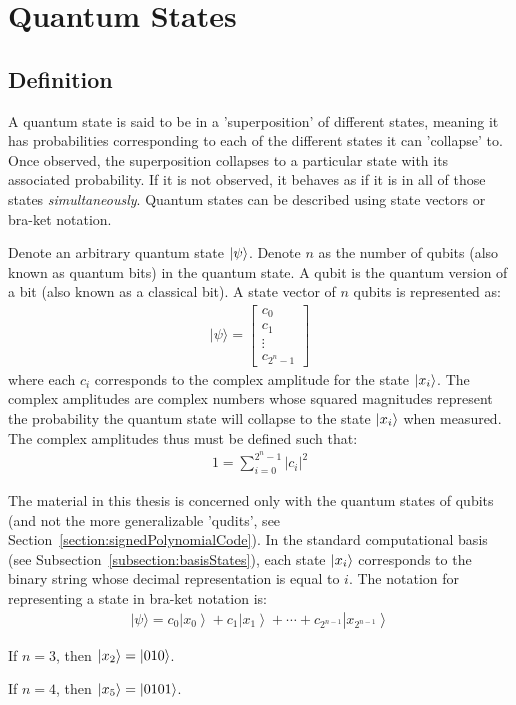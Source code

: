 \section{Quantum States}
\subsection{Definition}
A quantum state is said to be in a 'superposition' of different states, meaning it has probabilities corresponding to each of the different states it can 'collapse' to. Once observed, the superposition collapses to a particular state with its associated probability. If it is not observed, it behaves as if it is in all of those states \emph{simultaneously}. Quantum states can be described using state vectors or bra-ket notation.

Denote an arbitrary quantum state $\ket{\psi}$. Denote $n$ as the number of qubits (also known as quantum bits) in the quantum state. A qubit is the quantum version of a bit (also known as a classical bit). A state vector of $n$ qubits is represented as:
\begin{align}
|\psi\rangle=\left[\begin{array}{c}
c_{0} \\
c_{1} \\
\vdots \\
c_{2^n - 1}
\end{array}\right]
\end{align}
where each $c_i$ corresponds to the complex amplitude for the state $\ket{x_i}$. The complex amplitudes are complex numbers whose squared magnitudes represent the probability the quantum state will collapse to the state $\ket{x_i}$ when measured. The complex amplitudes thus must be defined such that:
\begin{align}
\label{eq:quantumStateConstraint}
1 = \sum_{i=0}^{2^n - 1} \lvert c_i \rvert ^2
\end{align}

The material in this thesis is concerned only with the quantum states of qubits (and not the more generalizable 'qudits', see Section~\ref{section:signedPolynomialCode}). In the standard computational basis (see Subsection~\ref{subsection:basisStates}), each state $\ket{x_i}$ corresponds to the binary string whose decimal representation is equal to $i$. The notation for representing a state in bra-ket notation is:
\begin{align}
\label{eq:braketArbitraryStandardBasisState}
|\psi\rangle=c_{0}\left|x_{0}\right\rangle+c_{1}\left|x_{1}\right\rangle+\cdots+c_{2^{n-1}}\left|x_{2^{n-1}}\right\rangle
\end{align}
\begin{example}
If $n=3$, then $\ket{x_2} = \ket{010}$.
\end{example}
\begin{example}
If $n=4$, then $\ket{x_5} = \ket{0101}$.
\end{example}

